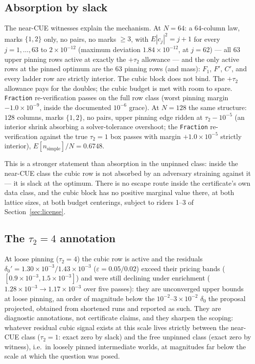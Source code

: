 \documentclass[11pt]{article}
\theoremstyle{plain}
\theoremstyle{definition}
\theoremstyle{remark}
\begin{document}
\subsection{Absorption by slack}
\label{sec:slack}

The near-CUE witnesses explain the mechanism. At $N = 64$: a $64$-column
law, marks $\{1, 2\}$ only, no pairs, no marks $\ge 3$, with
$E|c_j|^2 = j + 1$ for every $j = 1, \ldots, 63$ to $2 \times 10^{-12}$ (maximum
deviation $1.84 \times 10^{-12}$, at $j = 62$) --- all $63$ upper pinning rows
active at exactly the $+\tau_2$ allowance --- and the only active rows at
the pinned optimum are the $63$ pinning rows (and mass): $F_1$, $F'$, $C'$, and
every ladder row are strictly interior. The cubic block does not bind.
The $+\tau_2$ allowance pays for the doubles; the cubic budget is met with room
to spare. \texttt{Fraction} re-verification passes on the full row class (worst
pinning margin $-1.0 \times 10^{-9}$, inside the documented $10^{-6}$ grace). At
$N = 128$ the same structure: $128$ columns, marks $\{1, 2\}$, no pairs, upper
pinning edge ridden at $\tau_2 - 10^{-5}$ (an interior shrink absorbing a
solver-tolerance overshoot; the \texttt{Fraction} re-verification against the
true $\tau_2 = 1$ box passes with margin $+1.0 \times 10^{-5}$ strictly
interior), $E[n_{\mathrm{simple}}]/N = 0.6748$.

This is a stronger statement than absorption in the unpinned class: inside the
near-CUE class
the cubic row is not absorbed by an adversary straining against it --- it is
slack at the optimum. There is no escape route inside the certificate's own data
class, and the cubic block has no positive marginal value there, at both lattice
sizes, at both budget centerings, subject to riders 1--3 of
Section~\ref{sec:license}.

\subsection[The tau\_2 = 4 annotation]{The $\tau_2 = 4$ annotation}

At loose pinning ($\tau_2 = 4$) the cubic row is active and the residuals
$\delta_0' = 1.30 \times 10^{-3} / 1.43 \times 10^{-3}$
($\varepsilon = 0.05 / 0.02$) exceed their pricing bands
($[0.9 \times 10^{-3}, 1.5 \times 10^{-3}]$) and were still declining under
enrichment ($1.28 \times 10^{-3} \to 1.17 \times 10^{-3}$ over five passes): they
are unconverged upper bounds at loose pinning, an order of magnitude below the
$10^{-2}$--$3 \times 10^{-2}$ $\delta_0$ the proposal projected, obtained from
shortened runs and reported as such. They are diagnostic annotations, not
certificate claims, and they sharpen the scoping: whatever residual cubic signal
exists at this scale lives
strictly between the near-CUE class ($\tau_2 = 1$: exact zero by slack) and the
free unpinned class (exact zero by witness), i.e.\ in loosely pinned intermediate
worlds, at magnitudes far below the scale at which the question was posed.
\end{document}
